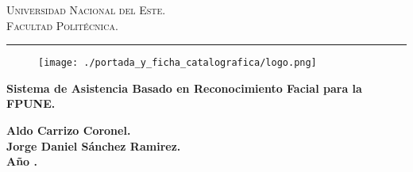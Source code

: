 \documentclass[12pt,a4paper,oneside]{book}
\begin{document}

\renewcommand\listtablename{\'Indice de Tablas}

\renewcommand{\tablename}{Tabla}
\renewcommand{\acronymname}{Acr\'onimos y s\'imbolos}
\renewcommand{\bibname}{Referencias bibliogr\'aficas}
\frontmatter
\vspace*{-3cm}
\begin{figure}[h]
\leavevmode
\begin{minipage}{\textwidth}
\begin{center}
\end{center}
\end{minipage}
\end{figure}

\thispagestyle{empty}

{\bf
\begin{center}
\large
\vspace*{-1 cm}\Large \textsc{Universidad Nacional del Este.} \\
\Large \textsc{Facultad Politécnica.} \\
\vspace*{0.5 cm}\hrule
\end{center}
}

\vspace*{-0.5 cm}
\begin{figure}[htb]
\begin{center}
\texttt{[image: ./portada\_y\_ficha\_catalografica/logo.png]}

\end{center}
\end{figure}


\vspace{3 cm}
{
\noindent
\begin{center}
\huge \bf Sistema de Asistencia Basado en Reconocimiento Facial para la FPUNE.
\end{center}
}


\vspace{5 cm}

\begin{center}
{\textbf{\Large Aldo Carrizo Coronel.}\\[5mm]
\textbf{\Large Jorge Daniel Sánchez Ramirez.}\\[5mm]
\vspace{1 cm}
\textbf{Año \the\year.}}
\end{center}

\end{document}
